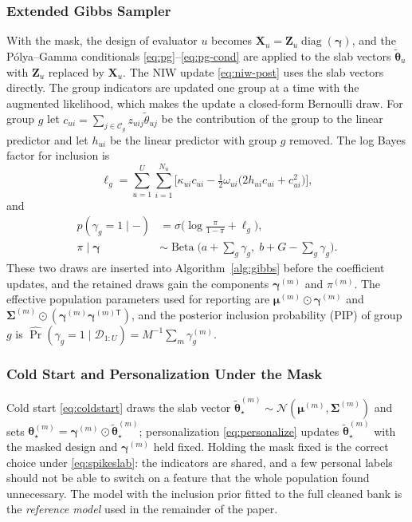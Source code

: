 \documentclass[lettersize,journal]{IEEEtran}
\newcommand{\Normal}{\mathcal{N}}
\newcommand{\Beta}{\operatorname{Beta}}
\newcommand{\sigmoid}{\sigma}
\newcommand{\diag}{\operatorname{diag}}
\newcommand{\T}{\mathsf{T}}
\newcommand{\D}{\mathcal{D}}
\newcommand{\newuser}{\star}
\newcommand{\thetatil}{\widetilde{\bm\theta}}
\begin{document}
\subsubsection{Extended Gibbs Sampler}
With the mask, the design of evaluator $u$ becomes $\bm X_u=\bm Z_u\diag(\bm\gamma)$, and the P\'{o}lya--Gamma conditionals \eqref{eq:pg}--\eqref{eq:pg-cond} are applied to the slab vectors $\thetatil_u$ with $\bm Z_u$ replaced by $\bm X_u$. The NIW update \eqref{eq:niw-post} uses the slab vectors directly. The group indicators are updated one group at a time with the augmented likelihood, which makes the update a closed-form Bernoulli draw. For group $g$ let $c_{ui}=\sum_{j\in\mathcal{C}_g}z_{uij}\widetilde\theta_{uj}$ be the contribution of the group to the linear predictor and let $h_{ui}$ be the linear predictor with group $g$ removed. The log Bayes factor for inclusion is
\begin{equation}
 \ell_g=\sum_{u=1}^{U}\sum_{i=1}^{N_u}\Big[\kappa_{ui}c_{ui}-\tfrac12\omega_{ui}\big(2h_{ui}c_{ui}+c_{ui}^2\big)\Big],
 \label{eq:gamma-bf}
\end{equation}
and
\begin{align}
 p(\gamma_g=1\mid-)&=\sigmoid\!\Big(\log\frac{\pi}{1-\pi}+\ell_g\Big),\label{eq:gamma-cond}\\
 \pi\mid\bm\gamma&\sim\Beta\Big(a+\textstyle\sum_g\gamma_g,\;b+G-\sum_g\gamma_g\Big).\label{eq:pi-cond}
\end{align}
These two draws are inserted into Algorithm~\ref{alg:gibbs} before the coefficient updates, and the retained draws gain the components $\bm\gamma^{(m)}$ and $\pi^{(m)}$. The effective population parameters used for reporting are $\bm\mu^{(m)}\odot\bm\gamma^{(m)}$ and $\bm\Sigma^{(m)}\odot(\bm\gamma^{(m)}\bm\gamma^{(m)\T})$, and the posterior inclusion probability (PIP) of group $g$ is $\widehat{\Pr}(\gamma_g=1\mid\D_{1:U})=M^{-1}\sum_m\gamma_g^{(m)}$.

\subsubsection{Cold Start and Personalization Under the Mask}
Cold start \eqref{eq:coldstart} draws the slab vector $\thetatil_{\newuser}^{(m)}\sim\Normal(\bm\mu^{(m)},\bm\Sigma^{(m)})$ and sets $\bm\theta^{(m)}_{\newuser}=\bm\gamma^{(m)}\odot\thetatil^{(m)}_{\newuser}$; personalization \eqref{eq:personalize} updates $\thetatil^{(m)}_{\newuser}$ with the masked design and $\bm\gamma^{(m)}$ held fixed. Holding the mask fixed is the correct choice under \eqref{eq:spikeslab}: the indicators are shared, and a few personal labels should not be able to switch on a feature that the whole population found unnecessary. The model with the inclusion prior fitted to the full cleaned bank is the \emph{reference model} used in the remainder of the paper.
\end{document}
